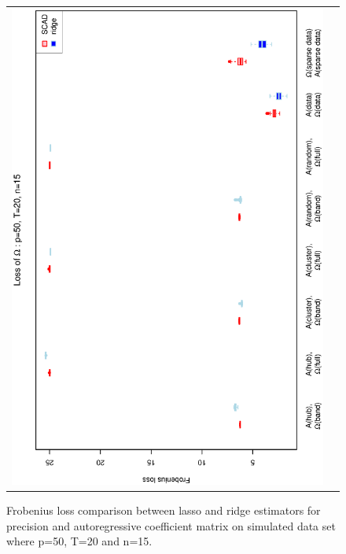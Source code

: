 \documentclass[a4paper]{article}
\begin{document}
\begin{figure}[h!]
\begin{tabular}{cc}
\includegraphics[scale=0.5,angle=270]{LossOmega50T20N15.eps}\\
\end{tabular}
\caption{Frobenius loss comparison between lasso and ridge estimators for precision and autoregressive coefficient matrix on simulated data set where p=50, T=20 and n=15.}
\label{fig:Loss50T20N15}
\end{figure}

\end{document}

